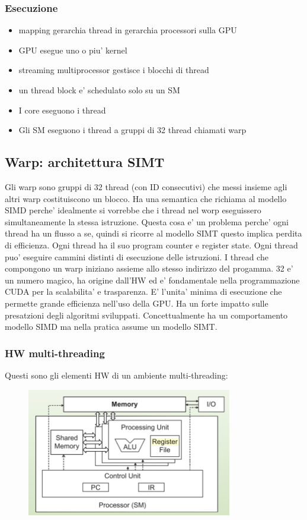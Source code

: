 \subsubsection{Esecuzione}
\begin{itemize}
    \item mapping gerarchia thread in gerarchia processori sulla GPU
    \item GPU esegue uno o piu' kernel
    \item streaming multiprocessor gestisce i blocchi di thread
    \item un thread block e' schedulato solo su un SM 
    \item I core eseguono i thread
    \item Gli SM eseguono i thread a gruppi di 32 thread chiamati warp
\end{itemize}

\subsection{Warp: architettura SIMT}
Gli warp sono gruppi di 32 thread (con ID consecutivi) che messi insieme agli altri warp costituiscono un blocco. Ha una semantica che richiama al modello SIMD perche' idealmente si vorrebbe che i thread nel worp eseguissero simultaneamente la stessa istruzione. Questa cosa e' un problema perche' ogni thread ha un flusso a se, quindi si ricorre al modello SIMT questo implica perdita di efficienza. Ogni thread ha il suo program counter e register state. Ogni thread puo' eseguire cammini distinti di esecuzione delle istruzioni. I thread che compongono un warp iniziano assieme allo stesso indirizzo del progamma.
32 e' un numero magico, ha origine dall'HW ed e' fondamentale nella programmazione CUDA per la scalabilita' e trasparenza. E' l'unita' minima di esecuzione che permette grande efficienza nell'uso della GPU. Ha un forte impatto sulle presatzioni degli algoritmi sviluppati. Concettualmente ha un comportamento modello SIMD ma nella pratica assume un modello SIMT.

\subsubsection{HW multi-threading}
Questi sono gli elementi HW di un ambiente multi-threading:
\begin{figure}[ht!]
    \centering
    \includegraphics[width=0.8\textwidth]{images/hwMultithreading.png}
\end{figure}

